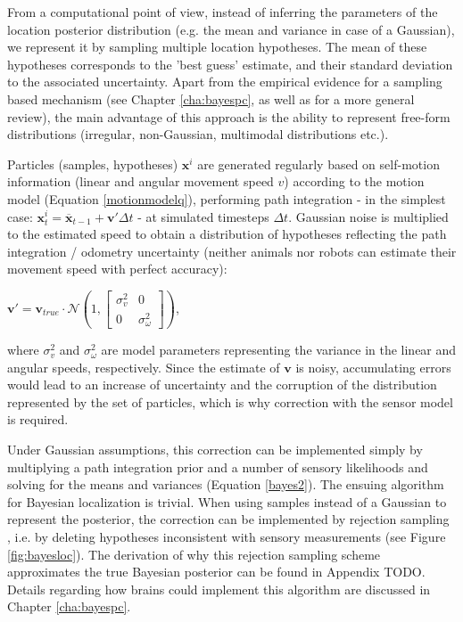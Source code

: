 From a computational point of view, instead of inferring the parameters of the location posterior distribution (e.g. the mean and variance in case of a Gaussian), we represent it by sampling multiple location hypotheses. The mean of these hypotheses corresponds to the 'best guess' estimate, and their standard deviation to the associated uncertainty. Apart from the empirical evidence for a sampling based mechanism (see Chapter \ref{cha:bayespc}, as well as \citep{fiser2010statistically} for a more general review), the main advantage of this approach is the ability to represent free-form distributions (irregular, non-Gaussian, multimodal distributions etc.).

Particles (samples, hypotheses) $\bm x^i$ are generated regularly based on self-motion information (linear and angular movement speed $v$) according to the motion model (Equation \ref{motionmodelq}), performing path integration - in the simplest case: $ \bm x_{t}^i = \overline{\bm x}_{t-1} + \bm v'\Delta t $ - at simulated timesteps $ \Delta t $. Gaussian noise is multiplied to the estimated speed to obtain a distribution of hypotheses reflecting the path integration / odometry uncertainty (neither animals nor robots can estimate their movement speed with perfect accuracy):

$\bm v' = \bm v_{true} \cdot \mathcal{N}(1, \begin{bmatrix}\sigma_v^2 & 0\\ 0 & \sigma_\omega^2\end{bmatrix}) $,

where $ \sigma_v^2 $ and $ \sigma_\omega^2 $ are model parameters representing the variance in the linear and angular speeds, respectively. Since the estimate of $\bm v$ is noisy, accumulating errors would lead to an increase of uncertainty and the corruption of the distribution represented by the set of particles, which is why correction with the sensor model is required. 

Under Gaussian assumptions, this correction can be implemented simply by multiplying a path integration prior and a number of sensory likelihoods and solving for the means and variances (Equation \ref{bayes2}). The ensuing algorithm for Bayesian localization is trivial. When using samples instead of a Gaussian to represent the posterior, the correction can be implemented by rejection sampling \citep{doucet2000sequential}, i.e. by deleting hypotheses inconsistent with sensory measurements (see Figure \ref{fig:bayesloc}). The derivation of why this rejection sampling scheme approximates the true Bayesian posterior can be found in Appendix TODO. Details regarding how brains could implement this algorithm are discussed in Chapter \ref{cha:bayespc}.

